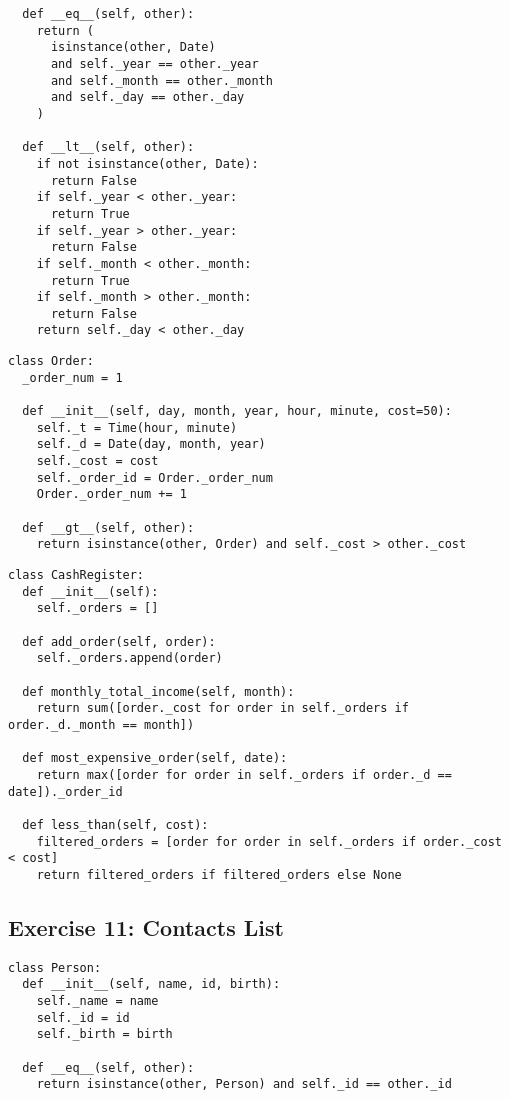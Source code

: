 \documentclass[11pt]{article}
\begin{document}
\begin{multicols}{2}
\begin{lstlisting}
  def __eq__(self, other):
    return (
      isinstance(other, Date)
      and self._year == other._year
      and self._month == other._month
      and self._day == other._day
    )

  def __lt__(self, other):
    if not isinstance(other, Date):
      return False
    if self._year < other._year:
      return True
    if self._year > other._year:
      return False
    if self._month < other._month:
      return True
    if self._month > other._month:
      return False
    return self._day < other._day
\end{lstlisting}

\begin{lstlisting}
class Order:
  _order_num = 1

  def __init__(self, day, month, year, hour, minute, cost=50):
    self._t = Time(hour, minute)
    self._d = Date(day, month, year)
    self._cost = cost
    self._order_id = Order._order_num
    Order._order_num += 1

  def __gt__(self, other):
    return isinstance(other, Order) and self._cost > other._cost
\end{lstlisting}

\begin{lstlisting}
class CashRegister:
  def __init__(self):
    self._orders = []

  def add_order(self, order):
    self._orders.append(order)

  def monthly_total_income(self, month):
    return sum([order._cost for order in self._orders if order._d._month == month])

  def most_expensive_order(self, date):
    return max([order for order in self._orders if order._d == date])._order_id

  def less_than(self, cost):
    filtered_orders = [order for order in self._orders if order._cost < cost]
    return filtered_orders if filtered_orders else None
\end{lstlisting}

\subsection{Exercise 11: Contacts List}\label{subsec:exercise-11}

\begin{lstlisting}
class Person:
  def __init__(self, name, id, birth):
    self._name = name
    self._id = id
    self._birth = birth

  def __eq__(self, other):
    return isinstance(other, Person) and self._id == other._id
\end{lstlisting}


\end{multicols}
\end{document}
